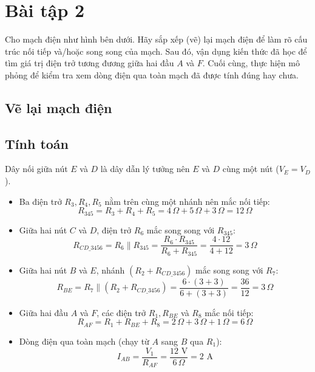 \section{Bài tập 2}

Cho mạch điện như hình bên dưới. Hãy sắp xếp (vẽ) lại mạch điện để làm rõ cấu trúc nối tiếp và/hoặc song song của mạch. Sau đó, vận dụng kiến thức đã học để tìm giá trị điện trở tương đương giữa hai đầu $A$ và $F$. Cuối cùng, thực hiện mô phỏng để kiểm tra xem dòng điện qua toàn mạch đã được tính đúng hay chưa.


\subsection{Vẽ lại mạch điện}

\subsection{Tính toán}
\noindent Dây nối giữa nút $E$ và $D$ là dây dẫn lý tưởng nên $E$ và $D$ cùng một nút ($V_E = V_D$).
\begin{itemize}[leftmargin=2em]
  \item Ba điện trở $R_3, R_4, R_5$ nằm trên cùng một nhánh nên mắc nối tiếp:
        \[
        R_{345} = R_3 + R_4 + R_5 = 4\,\Omega + 5\,\Omega + 3\,\Omega = 12\,\Omega
        \]
  \item Giữa hai nút $C$ và $D$, điện trở $R_6$ mắc song song với $R_{345}$:
        \[
        R_{CD\_3456} = R_6 \parallel R_{345} = \frac{R_6 \cdot R_{345}}{R_6 + R_{345}} = \frac{4 \cdot 12}{4 + 12} = 3\,\Omega
        \]
  \item Giữa hai nút $B$ và $E$, nhánh $(R_2 + R_{CD\_3456})$ mắc song song với $R_7$:
        \[
        R_{BE} = R_7 \parallel (R_2 + R_{CD\_3456}) = \frac{6 \cdot (3 + 3)}{6 + (3 + 3)} = \frac{36}{12} = 3\,\Omega
        \]
  \item Giữa hai đầu $A$ và $F$, các điện trở $R_1, R_{BE}$ và $R_8$ mắc nối tiếp:
        \[
        R_{AF} = R_1 + R_{BE} + R_8 = 2\,\Omega + 3\,\Omega + 1\,\Omega = 6\,\Omega
        \]
  \item Dòng điện qua toàn mạch (chạy từ $A$ sang $B$ qua $R_1$):
        \[
        I_{AB} = \frac{V_1}{R_{AF}} = \frac{12\text{ V}}{6\,\Omega} = 2\text{ A}
        \]
\end{itemize}

